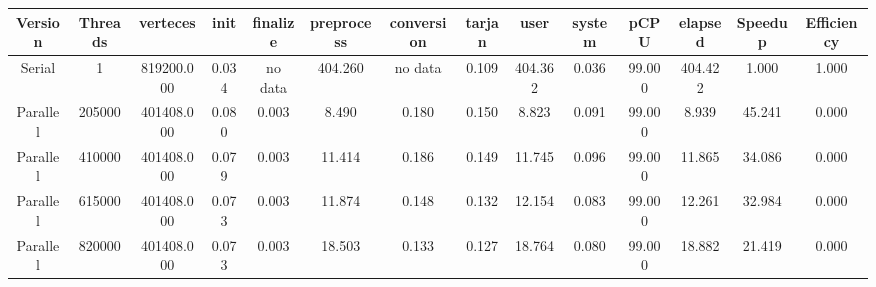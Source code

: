 \begin{tabular}{|c|c|c|c|c|c|c|c|c|c|c|c|c|c|}
\toprule
 Version &  Threads &   verteces &  init & finalize &  preprocess & conversion &  tarjan &    user &  system &   pCPU &  elapsed &  Speedup &  Efficiency \\
\midrule
  Serial &        1 & 819200.000 & 0.034 &  no data &     404.260 &    no data &   0.109 & 404.362 &   0.036 & 99.000 &  404.422 &    1.000 &       1.000 \\
Parallel &   205000 & 401408.000 & 0.080 &    0.003 &       8.490 &      0.180 &   0.150 &   8.823 &   0.091 & 99.000 &    8.939 &   45.241 &       0.000 \\
Parallel &   410000 & 401408.000 & 0.079 &    0.003 &      11.414 &      0.186 &   0.149 &  11.745 &   0.096 & 99.000 &   11.865 &   34.086 &       0.000 \\
Parallel &   615000 & 401408.000 & 0.073 &    0.003 &      11.874 &      0.148 &   0.132 &  12.154 &   0.083 & 99.000 &   12.261 &   32.984 &       0.000 \\
Parallel &   820000 & 401408.000 & 0.073 &    0.003 &      18.503 &      0.133 &   0.127 &  18.764 &   0.080 & 99.000 &   18.882 &   21.419 &       0.000 \\
\bottomrule
\end{tabular}
